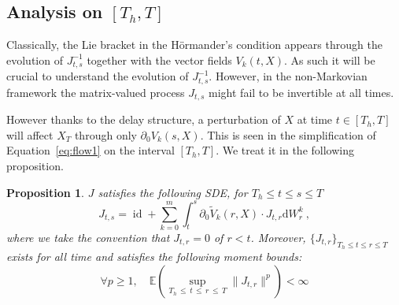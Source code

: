 \documentclass[11pt]{article}
\newtheorem{prop}[theo]{Proposition}
\theoremstyle{definition}
\numberwithin{equation}{section}
\numberwithin{figure}{section}
\numberwithin{table}{section}
\DeclareMathOperator{\id}{id}
\newcommand*\pa{\partial}
\newcommand*\E{\mathbb{E}}
\let\oldforall\forall
\renewcommand*{\forall}{\mathrel{\oldforall}}
\newcommand*{\dd}{\mathrm{d}}
\newcommand*{\dW}{\dd W}
\begin{document}
\subsection{Analysis \texorpdfstring{on $[T_h, T]$}{near T} }

Classically, the Lie bracket in the H\"ormander's condition appears through the evolution of $J^{-1}_{t,s}$ together with the vector fields $V_k(t,X)$. As such it will be crucial to understand the evolution of $J^{-1}_{t,s}$. However, in the non-Markovian framework the matrix-valued process $J_{t,s}$ might fail to be invertible at all times.

However thanks to the delay structure, a perturbation of $X$ at time $t \in [T_h, T]$ will affect $X_T$ through only $\pa_{0} V_k (s,X)$. This is seen in the simplification of Equation~\eqref{eq:flow1} on the interval $[T_h,T]$. We treat it in the following proposition.

\begin{prop}\label{proposition:tangent_flow_sde}
$J$ satisfies the following SDE, for $T_h\leq t \leq s \leq T$
\begin{equation}\label{eq:tangent_flow_sde}
J_{t,s} = \id +\sum_{k=0}^m \int_{t}^s \pa_0 \widetilde{V}_k (r,X) \cdot J_{t,r} \dW_r^k \ ,
\end{equation}
where we take the convention that $J_{t,r}=0$ of $r<t$. Moreover, $\{J_{t,r}\}_{T_h \leq t\leq r \leq T}$ exists for all time and satisfies the following moment bounds:
\[
\forall p \geq 1, \quad \E\left(\sup_{T_h\,\leq\,t \,\leq\,r\,\leq\,T} \lVert J_{t,r} \rVert^p \right) < \infty
\]
\end{prop}
\end{document}
